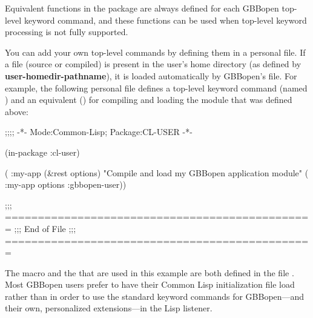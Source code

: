 \documentclass[10pt,twoside,english,pdftex]{article}
\begin{document}
Equivalent functions in the  package are always
defined for each GBBopen top-level keyword command, and these functions can be
used when top-level keyword processing is not fully supported.

%
%
%
%
%
You can add your own top-level commands by defining them in a personal
 file.  If a  file (source
or compiled) is present in the user's home directory (as defined by
\textbf{user-homedir-pathname}), it is loaded automatically by GBBopen's
 file.  For example, the following personal
 file defines a top-level keyword command (named
) and an equivalent  ()
for compiling and loading the  module that was defined above:

\begin{example}
  ;;;; -*- Mode:Common-Lisp; Package:CL-USER -*-

  (in-package :cl-user)

  ( :my-app (&rest options)
    "Compile and load my GBBopen application module"
    ( :my-app options :gbbopen-user))

  ;;; ===============================================
  ;;;   End of File
  ;;; ===============================================
\end{example}

The macro  and the  
that are used in this example are both defined in the file
.  Most GBBopen users
prefer to have their Common Lisp initialization file load
 rather than
 in order to use the
standard keyword commands for GBBopen---and their own, personalized
extensions---in the Lisp listener.

\label{sec:personal-gbbopen-modules-directory}
\end{document}
